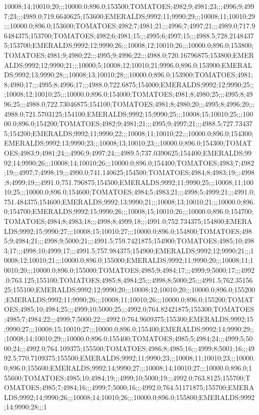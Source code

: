 10008;14;10010;20;;;10000.0;896.0;153500;TOMATOES;4982;9;4981;23;;;4996;9;4997;23;;;4989.0;719.6640625;153600;EMERALDS;9992;11;9990;29;;;10008;11;10010;29;;;10000.0;896.0;153600;TOMATOES;4982;7;4981;21;;;4996;7;4997;21;;;4989.0;717.96484375;153700;TOMATOES;4982;6;4981;15;;;4995;6;4997;15;;;4988.5;728.21484375;153700;EMERALDS;9992;12;9990;26;;;10008;12;10010;26;;;10000.0;896.0;153800;TOMATOES;4981;9;4980;22;;;4995;9;4996;22;;;4988.0;720.16796875;153800;EMERALDS;9992;12;9990;21;;;10000;5;10008;12;10010;21;9996.0;896.0;153900;EMERALDS;9992;13;9990;28;;;10008;13;10010;28;;;10000.0;896.0;153900;TOMATOES;4981;8;4980;17;;;4995;8;4996;17;;;4988.0;722.6875;154000;EMERALDS;9992;12;9990;25;;;10008;12;10010;25;;;10000.0;896.0;154000;TOMATOES;4981;8;4980;25;;;4995;8;4996;25;;;4988.0;722.73046875;154100;TOMATOES;4981;8;4980;20;;;4995;8;4996;20;;;4988.0;721.5703125;154100;EMERALDS;9992;15;9990;25;;;10008;15;10010;25;;;10000.0;896.0;154200;TOMATOES;4982;9;4981;21;;;4995;9;4997;21;;;4988.5;727.734375;154200;EMERALDS;9992;11;9990;22;;;10008;11;10010;22;;;10000.0;896.0;154300;EMERALDS;9992;13;9990;23;;;10008;13;10010;23;;;10000.0;896.0;154300;TOMATOES;4983;9;4981;24;;;4996;9;4997;24;;;4989.5;737.0390625;154400;EMERALDS;9992;14;9990;26;;;10008;14;10010;26;;;10000.0;896.0;154400;TOMATOES;4983;7;4982;19;;;4997;7;4998;19;;;4990.0;741.140625;154500;TOMATOES;4984;8;4983;19;;;4998;8;4999;19;;;4991.0;751.796875;154500;EMERALDS;9992;11;9990;25;;;10008;11;10010;25;;;10000.0;896.0;154600;TOMATOES;4984;5;4983;21;;;4998;5;4999;21;;;4991.0;751.484375;154600;EMERALDS;9992;13;9990;21;;;10008;13;10010;21;;;10000.0;896.0;154700;EMERALDS;9992;15;9990;26;;;10008;15;10010;26;;;10000.0;896.0;154700;TOMATOES;4984;8;4983;18;;;4998;8;4999;18;;;4991.0;752.734375;154800;EMERALDS;9992;15;9990;27;;;10008;15;10010;27;;;10000.0;896.0;154800;TOMATOES;4985;9;4984;21;;;4998;9;5000;21;;;4991.5;759.7421875;154900;TOMATOES;4985;10;4983;17;;;4998;10;4999;17;;;4991.5;757.984375;154900;EMERALDS;9992;12;9990;21;;;10008;12;10010;21;;;10000.0;896.0;155000;EMERALDS;9992;11;9990;20;;;10008;11;10010;20;;;10000.0;896.0;155000;TOMATOES;4985;9;4984;17;;;4999;9;5000;17;;;4992.0;763.125;155100;TOMATOES;4985;8;4984;25;;;4998;8;5000;25;;;4991.5;762.3515625;155100;EMERALDS;9992;12;9990;20;;;10008;12;10010;20;;;10000.0;896.0;155200;EMERALDS;9992;11;9990;26;;;10008;11;10010;26;;;10000.0;896.0;155200;TOMATOES;4985;10;4984;25;;;4999;10;5000;25;;;4992.0;764.82421875;155300;TOMATOES;4985;7;4984;22;;;4999;7;5000;22;;;4992.0;764.9609375;155300;EMERALDS;9992;15;9990;27;;;10008;15;10010;27;;;10000.0;896.0;155400;EMERALDS;9992;14;9990;29;;;10008;14;10010;29;;;10000.0;896.0;155400;TOMATOES;4985;5;4984;24;;;4999;5;5000;24;;;4992.0;764.109375;155500;TOMATOES;4986;8;4985;16;;;4999;8;5001;16;;;4992.5;770.7109375;155500;EMERALDS;9992;11;9990;23;;;10008;11;10010;23;;;10000.0;896.0;155600;EMERALDS;9992;14;9990;27;;;10008;14;10010;27;;;10000.0;896.0;155600;TOMATOES;4985;10;4984;19;;;4999;10;5000;19;;;4992.0;763.8125;155700;TOMATOES;4985;7;4984;16;;;4999;7;5000;16;;;4992.0;764.51171875;155700;EMERALDS;9992;14;9990;26;;;10008;14;10010;26;;;10000.0;896.0;155800;EMERALDS;9992;14;9990;28;;;1